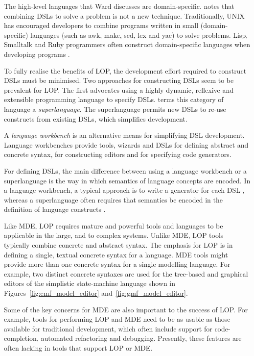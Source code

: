 The high-level languages that Ward discusses are domain-specific. \cite{fowler10dsls} notes that combining DSLs to solve a problem is not a new technique. Traditionally, UNIX has encouraged developers to combine programs written in small (domain-specific) languages (such as awk, make, sed, lex and yac) to solve problems. Lisp, Smalltalk and Ruby programmers often construct domain-specific languages when developing programs \cite{graham93lisp,fowler05language}.

To fully realise the benefits of LOP, the development effort required to construct DSLs must be minimised. Two approaches for constructing DSLs seem to be prevalent for LOP. The first advocates using a highly dynamic, reflexive and extensible programming language to specify DSLs. \cite{clark08superlanguages} terms this category of language a \textit{superlanguage}. The superlanguage permits new DSLs to re-use constructs from existing DSLs, which simplifies development.

A \textit{language workbench} \cite[ch. 9]{fowler10dsls} is an alternative means for simplifying DSL development. Language workbenches provide tools, wizards and DSLs for defining abstract and concrete syntax, for constructing editors and for specifying code generators.

For defining DSLs, the main difference between using a language workbench or a superlanguage is the way in which semantics of language concepts are encoded. In a language workbench, a typical approach is to write a generator for each DSL \cite{fowler10dsls}, whereas a superlanguage often requires that semantics be encoded in the definition of language constructs \cite{clark08superlanguages}.

Like MDE, LOP requires mature and powerful tools and languages to be applicable in the large, and to complex systems. Unlike MDE, LOP tools typically combine concrete and abstract syntax. The emphasis for LOP is in defining a single, textual concrete syntax for a language. MDE tools might provide more than one concrete syntax for a single modelling language. For example, two distinct concrete syntaxes are used for the tree-based and graphical editors of the simplistic state-machine language shown in Figures~\ref{fig:emf_model_editor} and~\ref{fig:gmf_model_editor}.

Some of the key concerns for MDE are also important to the success of LOP. For example, tools for performing LOP and MDE need to be as usable as those available for traditional development, which often include support for code-completion, automated refactoring and debugging. Presently, these features are often lacking in tools that support LOP or MDE.

